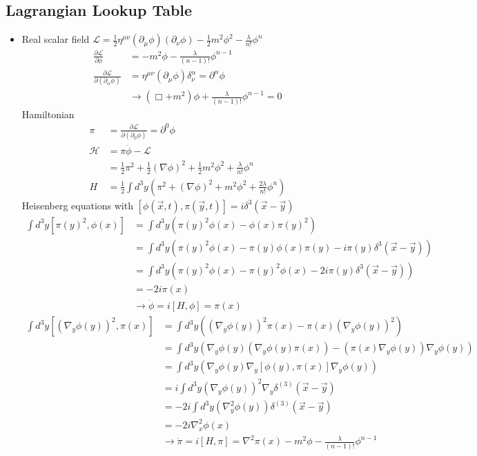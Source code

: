 \documentclass[10pt,a4paper]{book}
\theoremstyle{definition}
\begin{document}
\subsection{Lagrangian Lookup Table}
\begin{itemize}
\item Real scalar field $\mathcal{L}=\frac{1}{2}\eta^{\mu\nu}(\partial_\mu\phi)(\partial_\nu\phi)-\frac{1}{2}m^2\phi^2-\frac{\lambda}{n!}\phi^n$
\begin{align}
\frac{\partial\mathcal{L}}{\partial\phi}&=-m^2\phi-\frac{\lambda}{(n-1)!}\phi^{n-1}\\
\frac{\partial\mathcal{L}}{\partial(\partial_\alpha\phi)}&=\eta^{\mu\nu}(\partial_\mu\phi)\delta^\alpha_\nu=\partial^\alpha\phi\\
&\rightarrow (\Box+m^2)\phi+\frac{\lambda}{(n-1)!}\phi^{n-1}=0
\end{align}
Hamiltonian
\begin{align}
\pi&=\frac{\partial\mathcal{L}}{\partial(\partial_0\phi)}=\partial^0\phi\\
\mathcal{H}&=\pi\dot\phi-\mathcal{L}\\
&=\frac{1}{2}\pi^2+\frac{1}{2}(\nabla\phi)^2+\frac{1}{2}m^2\phi^2+\frac{\lambda}{n!}\phi^n\\
H&=\frac{1}{2}\int d^3y\left(\pi^2+(\nabla\phi)^2+m^2\phi^2+\frac{2\lambda}{n!}\phi^n\right)
\end{align}
Heisenberg equations with $[\phi(\vec{x},t),\pi(\vec{y},t)]=i\delta^3(\vec{x}-\vec{y})$
\begin{align}
\int d^3y[\pi(y)^2,\phi(x)]
&=\int d^3y\left(\pi(y)^2\phi(x)-\phi(x)\pi(y)^2\right)\\
&=\int d^3y\left(\pi(y)^2\phi(x)-\pi(y)\phi(x)\pi(y)-i\pi(y)\delta^3(\vec{x}-\vec{y})\right)\\
&=\int d^3y\left(\pi(y)^2\phi(x)-\pi(y)^2\phi(x)-2i\pi(y)\delta^3(\vec{x}-\vec{y})\right)\\
&=-2i\pi(x)\\
&\rightarrow \dot\phi=i[H,\phi]=\pi(x)
\end{align}
\begin{align}
\int d^3y[(\nabla_y\phi(y))^2,\pi(x)]
&=\int d^3y\left((\nabla_y\phi(y))^2\pi(x)-\pi(x)(\nabla_y\phi(y))^2\right)\\
&=\int d^3y\left(\nabla_y\phi(y)(\nabla_y\phi(y)\pi(x))-(\pi(x)\nabla_y\phi(y))\nabla_y\phi(y)\right)\\
&=\int d^3y\left(\nabla_y\phi(y)\nabla_y[\phi(y),\pi(x)]\nabla_y\phi(y)\right)\\
&=i\int d^3y\left(\nabla_y\phi(y)\right)^2\nabla_y\delta^{(3)}(\vec{x}-\vec{y})\\
&=-2i\int d^3y\left(\nabla^2_y\phi(y)\right)\delta^{(3)}(\vec{x}-\vec{y})\\
&=-2i\nabla^2_x\phi(x)\\
&\rightarrow \dot\pi=i[H,\pi]=\nabla^2\pi(x)-m^2\phi-\frac{\lambda}{(n-1)!}\phi^{n-1}
\end{align}


\end{itemize}
\end{document}
